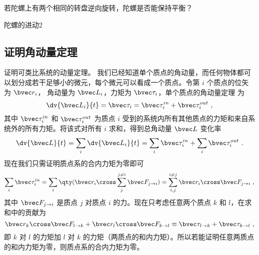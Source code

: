 \begin{exercise}{}
若陀螺上有两个相同的转盘逆向旋转，陀螺是否能保持平衡？
\end{exercise}

\begin{example}{陀螺的进动2}\label{ex_AMLaw_3}
\end{example}

\subsection{证明角动量定理}
证明可类比系统的动量定理。 我们已经知道单个质点的角动量，而任何物体都可以划分成若干足够小的微元，每个微元可以看成一个质点。令第 $i$ 个质点的位矢为 $\bvec r_i$， 角动量为 $\bvec L_i$，力矩为 $\bvec \tau_i$，单个质点的角动量定理 为
\begin{equation}
\dv{\bvec L_i}{t} = \bvec \tau_i = \bvec \tau_i^{in} + \bvec \tau_i^{out}~,
\end{equation}
其中 $\bvec \tau_i^{in}$ 和 $\bvec \tau_i^{out}$ 为质点 $i$ 受到的系统内所有其他质点的力矩和来自系统外的所有力矩。将该式对所有 $i$ 求和，得到总角动量 $\bvec L$ 变化率
\begin{equation}
\dv{\bvec L}{t} =\sum_i\dv{\bvec L_i}{t} = \sum_i\bvec \tau_i^{in} + \sum_i\bvec \tau_i^{out}~.
\end{equation}
现在我们只需证明质点系的合内力矩为零即可
\begin{equation}
\sum_i\bvec \tau_i^{in} = \sum_i \qty(\bvec r_i\cross\sum_j^{j\ne i}\bvec F_{j\to i}) = \sum_{i,j}^{i\ne j} \bvec r_i\cross\bvec F_{j\to i}~,
\end{equation}
其中 $\bvec F_{j\to i}$ 是质点 $j$ 对质点 $i$ 的力。现在只考虑任意两个质点 $k$ 和 $l$，在求和中的贡献为
\begin{equation}
\bvec r_k\cross\bvec F_{l\to k} + \bvec r_l\cross\bvec F_{k\to l} \equiv \bvec \tau_{l\to k}+ \bvec \tau_{k\to l}~,
\end{equation}
即 $k$ 对 $l$ 的力矩加 $l$ 对 $k$ 的力矩（两质点的和内力矩）。所以若能证明任意两质点的和内力矩为零，则质点系的合内力矩为零。

